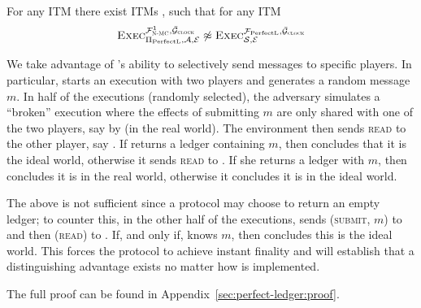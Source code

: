   \begin{theorem}
    \label{theorem:perfectledger}
    For any ITM \perfectprot{} there exist ITMs \perfectenv,
    \perfectadv{} such that for any ITM \simulator
    \begin{equation*}
      \textsc{Exec}^{\mathcal{F}_{\textsc{N-MC}}^1, \bar{\mathcal{G}}_{\textsc{clock}}}_{\Pi_{\mathrm{PerfectL}}, \mathcal{A},
      \mathcal{E}} \not\approx \textsc{Exec}^{\mathcal{F}_{\mathrm{PerfectL}},
      \bar{\mathcal{G}}_{\textsc{clock}}}_{\mathcal{S}, \mathcal{E}}
    \end{equation*}
  \end{theorem}

  \begin{proofsketch}
    We take advantage of \adversary's ability to selectively send messages to
    specific players. In particular, \environment{} starts an execution with two
    players and generates a random message $m$. In half of the executions
    (randomly selected),  the adversary simulates a ``broken''  \perfectprot{}
    execution where the effects of submitting $m$ are only shared with one of
    the two players, say \alice{} by \adversary{} (in the real world). The
    environment then sends \textsc{read} to the other player, say \bob. If
    \bob{} returns a ledger containing $m$, then \environment{} concludes that
    it is the ideal world, otherwise it sends \textsc{read} to \alice. If she
    returns a ledger with $m$, then \environment{} concludes it is in the real
    world, otherwise it concludes it is in the ideal world.

    The above is not sufficient since a protocol may choose to return an empty
    ledger; to counter this, in the other half of the executions, \environment{}
    sends (\textsc{submit}, $m$) to \alice{} and then (\textsc{read}) to \bob.
    If, and only if, \bob{} knows $m$, then \environment{} concludes this is the
    ideal world. This forces the \perfectprot{} protocol to achieve instant
    finality and will establish that a distinguishing advantage exists no matter
    how \perfectprot{} is implemented.
  \end{proofsketch}

  The full proof can be found in Appendix~\ref{sec:perfect-ledger:proof}.
